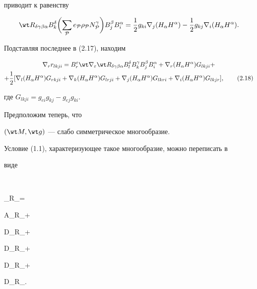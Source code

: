 приводит к равенству


$$


\wt R_{\delta\gamma\beta\alpha}B^\delta_k


\biggl(\sum_{\cal P}e_{\cal P}\rho_{\cal P}


N^\gamma_{\cal P}\biggr)B^\beta_j B^\alpha_i=


\frac{1}{2}g_{ki}\nabla_j(H_\alpha H^\alpha)-


\frac{1}{2}g_{kj}\nabla_i(H_\alpha H^\alpha).


$$


Подставляя последнее в (2.17), находим


\begin{multline}


\nabla_r r_{lkji}=B^\varepsilon_r\wt\nabla_\varepsilon


\wt R_{\delta\gamma\beta\alpha}B^\delta_l B^\gamma_k


B^\beta_j B^\alpha_i+\nabla_r(H_\alpha H^\alpha)


G_{lkji} + \\


+\frac{1}{2}[\nabla_l(H_\alpha H^\alpha)G_{rkji}


+\nabla_k(H_\alpha H^\alpha)G_{lrji}+


\nabla_j(H_\alpha H^\alpha)G_{lkri}+


\nabla_i(H_\alpha H^\alpha)G_{lkjr}],\tag{2.18}


\end{multline}


где $G_{lkji}=g_{ei}g_{kj}-g_{ej}g_{ki}$.





Предположим теперь, что


$(\wt M,\wt g)$ --- слабо симметрическое многообразие.


Условие (1.1), характеризующее такое многообразие, можно переписать в


виде


$$


\wt\nabla_\varepsilon\wt R_{\delta\gamma\beta\alpha}=


A_\varepsilon\wt R_{\delta\gamma\beta\alpha}+


D_\delta\wt R_{\varepsilon\gamma\beta\alpha}+


D_\gamma\wt R_{\delta\varepsilon\beta\alpha}+


D_\beta\wt R_{\delta\gamma\varepsilon\alpha}+


D_\alpha\wt R_{\delta\gamma\beta\varepsilon}.


